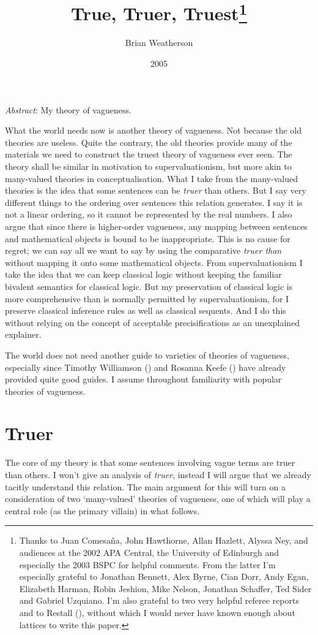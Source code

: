 \documentclass[
  11pt,
  letterpaper,
  DIV=11,
  numbers=noendperiod,
  twoside]{scrartcl}
\title{True, Truer, Truest\thanks{Thanks to Juan Comesaña, John
Hawthorne, Allan Hazlett, Alyssa Ney, and audiences at the 2002 APA
Central, the University of Edinburgh and especially the 2003 BSPC for
helpful comments. From the latter I'm especially grateful to Jonathan
Bennett, Alex Byrne, Cian Dorr, Andy Egan, Elizabeth Harman, Robin
Jeshion, Mike Nelson, Jonathan Schaffer, Ted Sider and Gabriel Uzquiano.
I'm also grateful to two very helpful referee reports and to Restall
(\citeproc{ref-Restall2000}{1999}), without which I would never have
known enough about lattices to write this paper.}}
\author{Brian Weatherson}
\date{2005}
\renewenvironment{abstract}
 {\vspace{-1.25cm}
 \quotation\small\noindent\emph{Abstract}:}
 {\endquotation}
\renewenvironment{abstract}
 {\quotation\small\noindent\emph{Abstract}:}
 {\endquotation\vspace{-0.02cm}}
\begin{document}
\maketitle
\begin{abstract}
My theory of vagueness.
\end{abstract}


What the world needs now is another theory of vagueness. Not because the
old theories are useless. Quite the contrary, the old theories provide
many of the materials we need to construct the truest theory of
vagueness ever seen. The theory shall be similar in motivation to
supervaluationism, but more akin to many-valued theories in
conceptualisation. What I take from the many-valued theories is the idea
that some sentences can be \emph{truer} than others. But I say very
different things to the ordering over sentences this relation generates.
I say it is not a linear ordering, so it cannot be represented by the
real numbers. I also argue that since there is higher-order vagueness,
any mapping between sentences and mathematical objects is bound to be
inappropriate. This is no cause for regret; we can say all we want to
say by using the comparative \emph{truer than} without mapping it onto
some mathematical objects. From supervaluationism I take the idea that
we can keep classical logic without keeping the familiar bivalent
semantics for classical logic. But my preservation of classical logic is
more comprehensive than is normally permitted by supervaluationism, for
I preserve classical inference rules as well as classical sequents. And
I do this without relying on the concept of acceptable precisifications
as an unexplained explainer.

The world does not need another guide to varieties of theories of
vagueness, especially since Timothy Williamson
() and Rosanna Keefe
() have already provided quite good
guides. I assume throughout familiarity with popular theories of
vagueness.

\section{Truer}\label{truer}

The core of my theory is that some sentences involving vague terms are
truer than others. I won't give an analysis of \emph{truer}, instead I
will argue that we already tacitly understand this relation. The main
argument for this will turn on a consideration of two `many-valued'
theories of vagueness, one of which will play a central role (as the
primary villain) in what follows.
\end{document}
